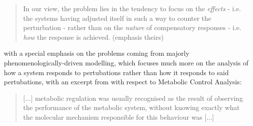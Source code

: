 \documentclass[a4paper,12pt,twoside,leqno]{article}
\begin{document}
\begin{quote}
In our view, the problem lies in the tendency to focus on the \textit{effects} - i.e. the systems
having adjusted itself in such a way to counter the perturbation - rather than on the
\textit{nature} of compensatory responses - i.e. \textit{how} the response is achieved. (emphasis theirs)
\end{quote} 

with a special emphasis on the problems coming from majorly phenomenologically-driven modelling, which focuses much more on the analysis of how a system responds to pertubations rather than how it responds to said pertubations, with an excerpt from \cite{hofmeyr1991quantitative} with respect to Metabolic Control Analysis:

\begin{quote}
[...] metabolic regulation was usually recognised as the result of observing
the performance of the metabolic system, without knowing exactly what the
molecular mechanism responsible for this behaviour was [...]
\end{quote}
\end{document}
